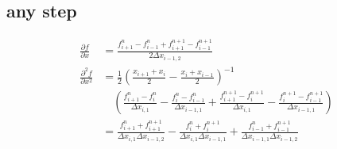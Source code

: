 \documentclass{article}
\begin{document}
%
%
\subsection{any step}

    \begin{equation}
        \begin{split}
            \frac{\partial f}{\partial x} &=
            \frac{f_{i+1}^n -f_{i-1}^n + f_{i+1}^{n+1} - f_{i-1}^{n+1}}
                {2 \Delta x_{i-1,2}} 
            \\
            \frac{\partial^2 f}{\partial x^2} &=
            \frac{1}{2}\left(\frac{x_{i+1}+x_i}{2} - \frac{x_i+x_{i-1}}{2}\right)^{-1}
            \\
            & \quad \left(
            \frac{f_{i+1}^n-f_{i}^n}{\Delta x_{i,1}}
            -\frac{f_{i}^n-f_{i-1}^n}{\Delta x_{i-1,1}}
            +\frac{f_{i+1}^{n+1}-f_{i}^{n+1}}{\Delta x_{i,1}}
            -\frac{f_{i}^{n+1}-f_{i-1}^{n+1}}{\Delta x_{i-1,1}}
            \right)
            \\
            &=\frac{f_{i+1}^n + f_{i+1}^{n+1}}
                {\Delta x_{i,1} \Delta x_{i-1,2}}
            - \frac{f_i^n + f_i^{n+1}}
                {\Delta x_{i,1} \Delta x_{i-1,1}}
            + \frac{f_{i-1}^n + f_{i-1}^{n+1}}
                {\Delta x_{i-1,1} \Delta x_{i-1,2}}
        \end{split}
    \end{equation}
\end{document}

